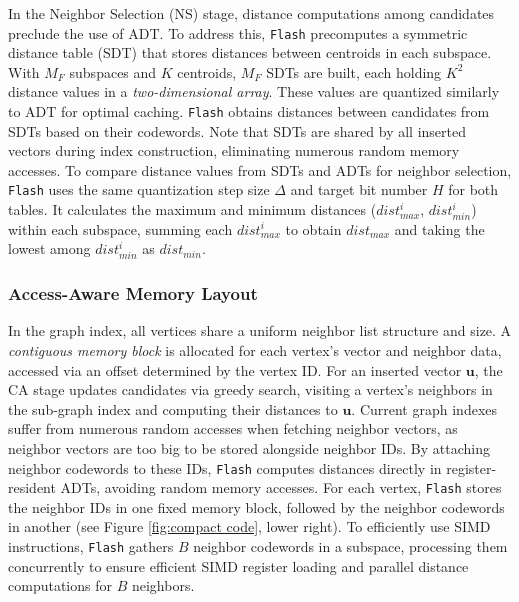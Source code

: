 In the Neighbor Selection (NS) stage, distance computations among candidates preclude the use of ADT. To address this, \texttt{Flash} precomputes a symmetric distance table (SDT) that stores distances between centroids in each subspace. {With $M_F$ subspaces and $K$ centroids, $M_F$ SDTs are built, each holding $K^2$ distance values in a \textit{two-dimensional array}.} These values are quantized similarly to ADT for optimal caching. \texttt{Flash} obtains distances between candidates from SDTs based on their codewords. Note that SDTs are shared by all inserted vectors during index construction, eliminating numerous random memory accesses.
To compare distance values from SDTs and ADTs for neighbor selection, \texttt{Flash} uses the same quantization step size $\Delta$ and target bit number $H$ for both tables. It calculates the maximum and minimum distances ($dist_{max}^{i}$, $dist_{min}^{i}$) within each subspace, summing each $dist_{max}^{i}$ to obtain $dist_{max}$ and taking the lowest among $dist_{min}^{i}$ as $dist_{min}$.

\subsubsection{\textbf{Access-Aware Memory Layout}}
{In the graph index, all vertices share a uniform neighbor list structure and size. A \textit{contiguous memory block} is allocated for each vertex's vector and neighbor data, accessed via an offset determined by the vertex ID.}
For an inserted vector $\boldsymbol{u}$, the CA stage updates candidates via greedy search, visiting a vertex's neighbors in the sub-graph index and computing their distances to $\boldsymbol{u}$.
Current graph indexes suffer from numerous random accesses when fetching neighbor vectors, as neighbor vectors are too big to be stored alongside neighbor IDs. By attaching neighbor codewords to these IDs, \texttt{Flash} computes distances directly in register-resident ADTs, avoiding random memory accesses. {For each vertex, \texttt{Flash} stores the neighbor IDs in one fixed memory block, followed by the neighbor codewords in another (see Figure \ref{fig:compact code}, lower right).} To efficiently use SIMD instructions, \texttt{Flash} gathers $B$ neighbor codewords in a subspace, processing them concurrently to ensure efficient SIMD register loading and parallel distance computations for $B$ neighbors.

